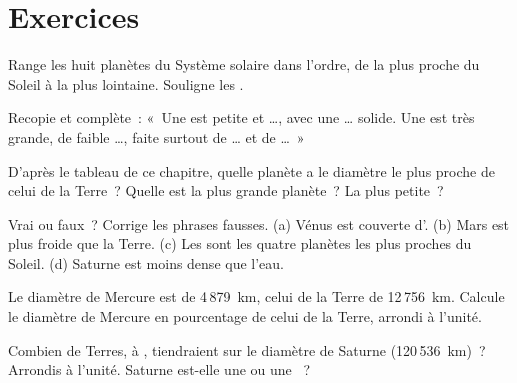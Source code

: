\section{Exercices}

\begin{exercise}[$\star$]\label{exo:g6:earth-a-planet:1}
Range les huit planètes du Système solaire dans l'ordre, de la plus proche
du Soleil à la plus lointaine. Souligne les .
\end{exercise}

\begin{exercise}[$\star$]\label{exo:g6:earth-a-planet:2}
Recopie et complète~: «~Une  est petite et \ldots, avec
une \ldots{} solide. Une  est très grande, de faible \ldots,
faite surtout de \ldots{} et de \ldots{}~»
\end{exercise}

\begin{exercise}[$\star$]\label{exo:g6:earth-a-planet:3}
D'après le tableau de ce chapitre, quelle planète a le diamètre le plus
proche de celui de la Terre~? Quelle est la plus grande planète~? La plus
petite~?
\end{exercise}

\begin{exercise}[$\star$]\label{exo:g6:earth-a-planet:4}
Vrai ou faux~? Corrige les phrases fausses.
(a) Vénus est couverte d'.
(b) Mars est plus froide que la Terre.
(c) Les  sont les quatre planètes les plus proches du Soleil.
(d) Saturne est moins dense que l'eau.
\end{exercise}

\begin{exercise}[$\star\star$]\label{exo:g6:earth-a-planet:5}
Le diamètre de Mercure est de 4\,879~km, celui de la Terre de
12\,756~km. Calcule le diamètre de Mercure en pourcentage de celui de la
Terre, arrondi à l'unité.
\end{exercise}

\begin{exercise}[$\star\star$]\label{exo:g6:earth-a-planet:6}
Combien de Terres,  à , tiendraient sur le diamètre de Saturne
(120\,536~km)~? Arrondis à l'unité. Saturne est-elle une 
ou une ~?
\end{exercise}

